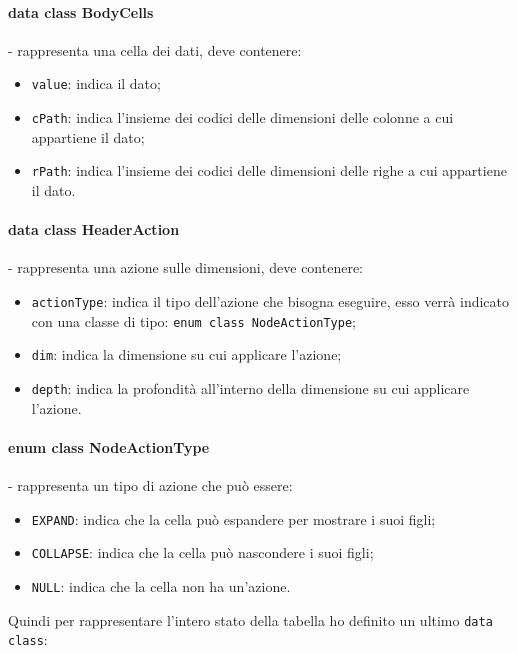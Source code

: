 \paragraph*{data class BodyCells}- rappresenta una cella dei dati, deve contenere:
\begin{itemize}
	\item \verb|value|: indica il dato;
	\item \verb|cPath|: indica l'insieme dei codici delle dimensioni delle colonne a cui appartiene il dato;
	\item \verb|rPath|: indica l'insieme dei codici delle dimensioni delle righe a cui appartiene il dato.
\end{itemize}	

\paragraph*{data class HeaderAction}- rappresenta una azione sulle dimensioni, deve contenere:
\begin{itemize}
	\item \verb|actionType|: indica il tipo dell'azione che bisogna eseguire, esso verrà indicato con una classe di tipo: \verb|enum class NodeActionType|;
	\item \verb|dim|: indica la dimensione su cui applicare l'azione;
	\item \verb|depth|: indica la profondità all'interno della dimensione su cui applicare l'azione.
\end{itemize}

\paragraph*{enum class NodeActionType}- rappresenta un tipo di azione che può essere:
\begin{itemize}
	\item \verb|EXPAND|: indica che la cella può espandere per mostrare i suoi figli;
	\item \verb|COLLAPSE|: indica che la cella può nascondere i suoi figli;
	\item \verb|NULL|: indica che la cella non ha un'azione.
\end{itemize}
\noindent
Quindi per rappresentare l'intero stato della tabella ho definito un ultimo \verb|data class|:
